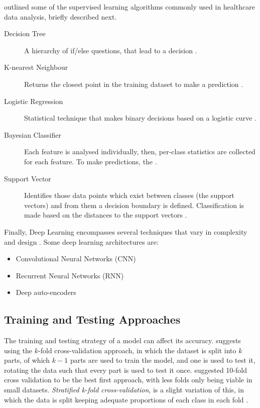 \documentclass[a4paper,12pt]{article}
\begin{document}
\textcite{Jothi2015} outlined some of the supervised learning algorithms
commonly used in healthcare data analysis, briefly described next.

\begin{description}
    \item[Decision Tree] A hierarchy of if/else questions, that lead to a decision \parencite{Mueller2017}.
    \item[K-nearest Neighbour] Returns the closest point in the training dataset
    to make a prediction \parencite{Mueller2017}.
    \item[Logistic Regression] Statistical technique that makes binary decisions
    based on a logistic curve \parencite{Nick2007}.
    \item[Bayesian Classifier] Each feature is analysed individually, then,
    per-class statistics are collected for each feature. 
    To make predictions, the .
    \item[Support Vector] Identifies those data points which exist between classes
    (the support vectors) and from them a decision boundary is defined.
    Classification is made based on the distances to the support vectors \parencite[98]{Mueller2017}.
\end{description}


Finally, Deep Learning encompasses several techniques that vary in complexity and design \parencite{Ibrahim2021}.
Some deep learning architectures are:

\begin{itemize}
 \item Convolutional Neural Networks (CNN)
 \item Recurrent Neural Networks (RNN)
 \item Deep auto-encoders
\end{itemize}


\subsection{Training and Testing Approaches}

The training and testing strategy of a model can affect its accuracy.
\textcite[39]{Consoli2019} suggests using the \(k\)-fold cross-validation approach,
in which the dataset is split into \(k\) parts, of which \(k-1\) parts are used
to train the model, and one is used to test it, rotating the data such that
every part is used to test it once.
\textcite{Wong2020} suggested 10-fold cross validation to be the best first
approach, with less folds only being viable in small datasets.
\textit{Stratified k-fold cross-validation}, is a slight variation of this,
in which the data is split keeping adequate proportions of each class in each fold \parencite{Mueller2017}.
\end{document}

